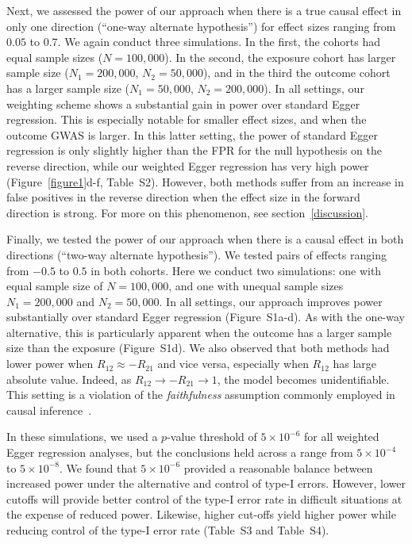\documentclass{article}
\begin{document}
Next, we assessed the power of our approach when there is a true causal effect in only one direction (``one-way alternate hypothesis'') for effect sizes ranging from $0.05$ to $0.7$. We again conduct three simulations.
In the first, the cohorts had equal sample sizes ($N = 100,000$). In the second, the exposure
cohort has larger sample size ($N_1 = 200,000$, $N_2 = 50,000$),
and in the third the outcome cohort has a larger sample size ($N_1 = 50,000$, $N_2 = 200,000$).
In all settings, our weighting scheme shows
a substantial gain in power over standard Egger regression. This is especially
notable for smaller effect sizes, and when the outcome GWAS is larger.
In this latter setting, the power of standard Egger regression is only slightly
higher than the FPR for the null hypothesis on the reverse direction,
while our weighted Egger regression has very high power
(Figure~\ref{figure1}d-f, Table~S2). However, both
methods suffer from an increase in false positives in the reverse direction
when the effect size in the forward direction is strong. For more on this
phenomenon, see section~\ref{discussion}.

Finally, we tested the power of our approach when there is a causal effect in both directions (``two-way alternate
hypothesis''). We tested pairs of effects ranging from $-0.5$ to $0.5$ in both cohorts.
Here we conduct two simulations: one with equal sample size of $N=100,000$,
and one with unequal sample sizes $N_1 = 200,000$ and $N_2 = 50,000$.
In all settings, our approach improves power
substantially over standard Egger regression (Figure~S1a-d). As with
the one-way alternative, this is particularly apparent when the outcome has a larger
sample size than the exposure (Figure~S1d). We also observed that both
methods had lower power when $R_{12} \approx -R_{21}$ and vice versa, especially when
$R_{12}$ has large absolute value. Indeed, as $R_{12} \rightarrow -R_{21} \rightarrow 1$, the model
becomes unidentifiable. This setting is a violation of the \emph{faithfulness}
assumption commonly employed in causal inference~\cite{Pearl2000}.

In these simulations, we used a $p$-value threshold of $5\times 10^{-6}$
for all weighted Egger regression analyses, but the conclusions held across a range
from $5\times 10^{-4}$ to $5\times 10^{-8}$. We found that
$5\times 10^{-6}$ provided a reasonable balance between increased power under 
the alternative and control of type-I errors. However, lower
cutoffs will provide better control of the type-I error rate in difficult situations
at the expense of reduced power. Likewise, higher cut-offs yield higher power
while reducing control of the type-I error rate
(Table~S3 and Table~S4). 
\end{document}
